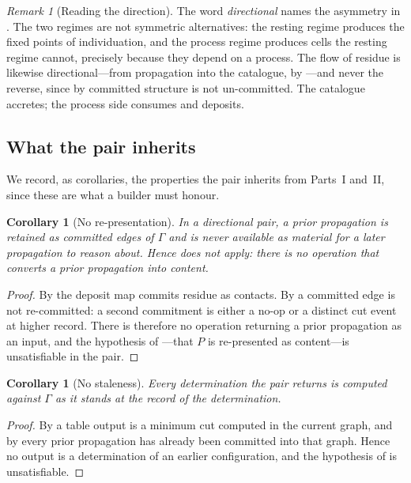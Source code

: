 \documentclass[11pt,twocolumn,a4paper]{article}
\theoremstyle{dirthm}
\newtheorem{corollary}[theorem]{Corollary}
\theoremstyle{definition}
\theoremstyle{remark}
\newtheorem{remark}[theorem]{Remark}
\newcommand{\Gph}{\Gamma}
\begin{document}
\begin{remark}[Reading the direction]
\label{rem:direction}
The word \emph{directional} names the asymmetry in
. The two regimes are not symmetric alternatives:
the resting regime produces the fixed points of individuation, and the
process regime produces cells the resting regime cannot, precisely because
they depend on a process. The flow of residue is likewise directional---from
propagation into the catalogue, by ---and never the
reverse, since by  committed structure is not un-committed.
The catalogue accretes; the process side consumes and deposits.
\end{remark}

\subsection{What the pair inherits}

We record, as corollaries, the properties the pair inherits from
Parts~I and~II, since these are what a builder must honour.

\begin{corollary}[No re-presentation]
\label{cor:no-representation}
In a directional pair, a prior propagation is retained as committed edges of
$\Gph$ and is never available as material for a later propagation to reason
about. Hence  does not apply: there is no operation
that converts a prior propagation into content.
\end{corollary}

\begin{proof}
By  the deposit map commits residue as contacts. By
 a committed edge is not re-committed: a second commitment
is either a no-op or a distinct cut event at higher record. There is
therefore no operation returning a prior propagation as an input, and the
hypothesis of ---that $P$ is re-presented as
content---is unsatisfiable in the pair.
\end{proof}

\begin{corollary}[No staleness]
\label{cor:no-staleness}
Every determination the pair returns is computed against $\Gph$ as it stands
at the record of the determination.
\end{corollary}

\begin{proof}
By  a table output is a minimum cut computed in the current
graph, and by  every prior propagation has already been
committed into that graph. Hence no output is a determination of an earlier
configuration, and the hypothesis of  is unsatisfiable.
\end{proof}
\end{document}
